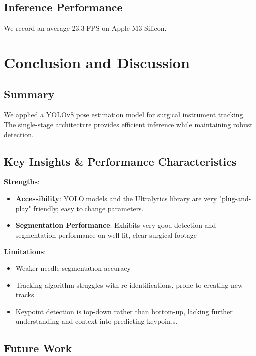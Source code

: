 \documentclass[11pt]{article}
\begin{document}
\subsection{Inference Performance}

We record an average 23.3 FPS on Apple M3 Silicon.

\section{Conclusion and Discussion}

\subsection{Summary}

We applied a YOLOv8 pose estimation model for surgical instrument tracking. The single-stage architecture provides efficient inference while maintaining robust detection.

\subsection{Key Insights \& Performance Characteristics}

\textbf{Strengths}:
\begin{itemize}[noitemsep]
    \item \textbf{Accessibility}: YOLO models and the Ultralytics library are very "plug-and-play" friendly; easy to change parameters.
    \item \textbf{Segmentation Performance}: Exhibits very good detection and segmentation performance on well-lit, clear surgical footage
\end{itemize}

\noindent \textbf{Limitations}:
\begin{itemize}[noitemsep]
    \item Weaker needle segmentation accuracy
    \item Tracking algorithm struggles with re-identifications, prone to creating new tracks
    \item Keypoint detection is top-down rather than bottom-up, lacking further understanding and context into predicting keypoints.
\end{itemize}

\subsection{Future Work}
\end{document}
